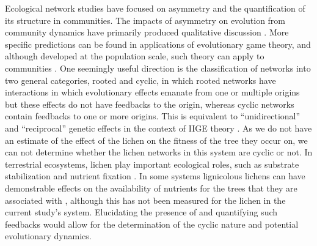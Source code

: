 \documentclass[fleqn,12pt]{olplainarticle}
\begin{document}
Ecological network studies have focused on asymmetry and the
quantification of its structure in communities. The impacts of
asymmetry on evolution from community dynamics have primarily produced
qualitative discussion \citep{Bascompte2006, Diaz-Castelazo2010,
  Guimaraes2011, Thompson2013}. More specific predictions can be found
in applications of evolutionary game theory, and although developed at
the population scale, such theory can apply to communities
\citep{Lieberman2005EvolutionaryGraphs}. One seemingly useful
direction is the classification of networks into two general
categories, rooted and cyclic, in which rooted networks have
interactions in which evolutionary effects emanate from one or
multiple origins but these effects do not have feedbacks to the
origin, whereas cyclic networks contain feedbacks to one or more
origins. This is equivalent to ``unidirectional'' and ``reciprocal''
genetic effects in the context of IIGE theory
\citep{Whitham2020IntraspecificEvolution}. As we do not have an
estimate of the effect of the lichen on the fitness of the tree they
occur on, we can not determine whether the lichen networks in this
system are cyclic or not. In terrestrial ecosystems, lichen play
important ecological roles, such as substrate stabilization
\citep{Root2011BioticWashington} and nutrient fixation
\citep{Nelson2018LichenHelens}. In some systems lignicolous lichens
can have demonstrable effects on the availability of nutrients for the
trees that they are associated with \citep{Norby1989NitrogenDioxide},
although this has not been measured for the lichen in the current
study's system. Elucidating the presence of and quantifying such
feedbacks would allow for the determination of the cyclic nature and
potential evolutionary dynamics.
\end{document}
